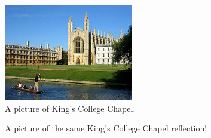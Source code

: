 \begin{figure}[h!]
  \caption{A picture of King's College Chapel.}
  \centering
    \includegraphics[width=0.5\textwidth]{Chapter2/Figures/Kings.jpg}
\end{figure}
 
\begin{figure}[h!]
  \centering
  \caption{A picture of the same King's College
  			Chapel reflection!}
\end{figure}

